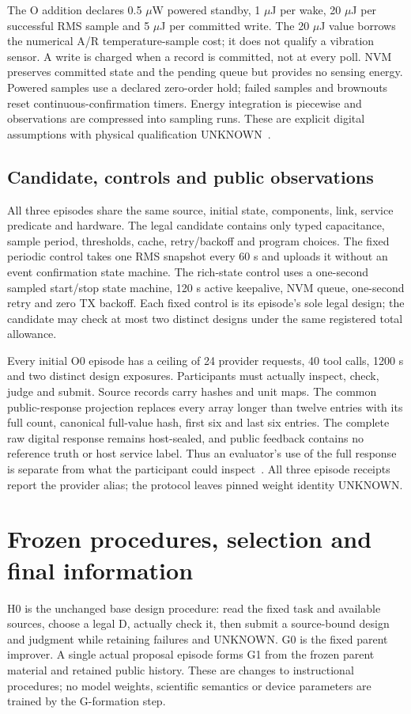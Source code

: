 The O addition declares 0.5 $\mu$W powered standby, 1 $\mu$J per wake,
20 $\mu$J per successful RMS sample and 5 $\mu$J per committed write.
The 20 $\mu$J value borrows the numerical A/R temperature-sample cost; it does
not qualify a vibration sensor. A write is charged when a record is committed,
not at every poll. NVM preserves committed state and the pending queue but
provides no sensing energy. Powered samples use a declared zero-order hold;
failed samples and brownouts reset continuous-confirmation timers.
Energy integration is piecewise and observations are compressed into sampling
runs. These are explicit digital assumptions with physical qualification
UNKNOWN~\cite{case}.

\subsection{Candidate, controls and public observations}
All three episodes share the same source, initial state, components, link,
service predicate and hardware. The legal candidate contains only typed
capacitance, sample period, thresholds, cache, retry/backoff and program
choices. The fixed periodic control takes one RMS snapshot every 60 s and
uploads it without an event confirmation state machine. The rich-state control
uses a one-second sampled start/stop state machine, 120 s active keepalive,
NVM queue, one-second retry and zero TX backoff. Each fixed control is its
episode's sole legal design; the candidate may check at most two distinct
designs under the same registered total allowance.

Every initial O0 episode has a ceiling of 24 provider requests, 40 tool calls,
1200 s and two distinct design exposures. Participants must actually inspect,
check, judge and submit. Source records carry hashes and unit maps. The common
public-response projection replaces every array longer than twelve entries
with its full count, canonical full-value hash, first six and last six entries.
The complete raw digital response remains host-sealed, and public feedback
contains no reference truth or host service label. Thus an evaluator's use of
the full response is separate from what the participant could inspect~\cite{protocol}.
All three episode receipts report the  provider alias;
the protocol leaves pinned weight identity UNKNOWN.

\section{Frozen procedures, selection and final information}
H0 is the unchanged base design procedure: read the fixed task and available
sources, choose a legal D, actually check it, then submit a source-bound design
and judgment while retaining failures and UNKNOWN. G0 is the fixed parent
improver. A single actual proposal episode forms G1 from the frozen parent
material and retained public history. These are changes to instructional
procedures; no model weights, scientific semantics or device parameters are
trained by the G-formation step.

